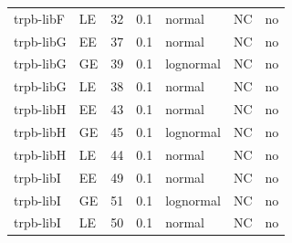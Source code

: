 \begin{longtable}[c]{lllllll}
trpb-libF & LE & 32 & 0.1 & normal & NC & no \\
trpb-libG & EE & 37 & 0.1 & normal & NC & no \\
trpb-libG & GE & 39 & 0.1 & lognormal & NC & no \\
trpb-libG & LE & 38 & 0.1 & normal & NC & no \\
trpb-libH & EE & 43 & 0.1 & normal & NC & no \\
trpb-libH & GE & 45 & 0.1 & lognormal & NC & no \\
trpb-libH & LE & 44 & 0.1 & normal & NC & no \\
trpb-libI & EE & 49 & 0.1 & normal & NC & no \\
trpb-libI & GE & 51 & 0.1 & lognormal & NC & no \\
trpb-libI & LE & 50 & 0.1 & normal & NC & no \\
\end{longtable}
\endgroup

